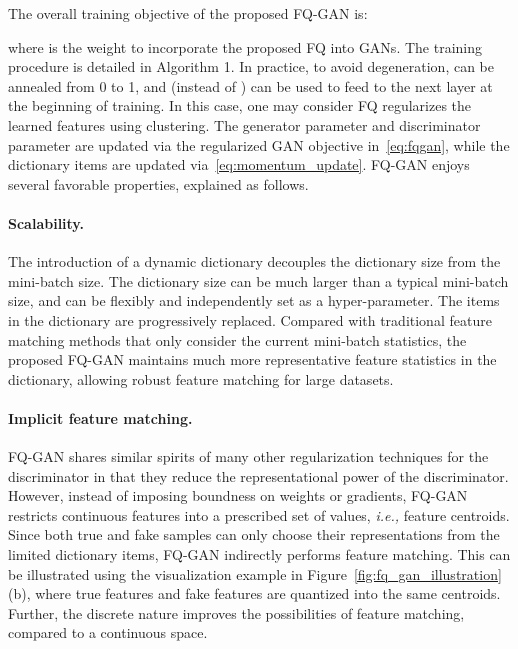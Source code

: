 \documentclass{article}
\newcommand{\ie}[0]{\emph{i.e., }}
\begin{document}
The overall training objective of the proposed FQ-GAN is:

where  is the weight to incorporate the proposed FQ into GANs. The training procedure is detailed in Algorithm 1. In practice, to avoid degeneration,  can be annealed from 0 to 1, and  (instead of ) can be used to feed to the next layer at the beginning of training. In this case, one may consider FQ regularizes the learned features using clustering. The generator parameter  and discriminator parameter  are updated via the regularized GAN objective in~\eqref{eq:fqgan},
while the dictionary items  are updated via~\eqref{eq:momentum_update}.   
FQ-GAN enjoys several favorable properties, explained as follows. 


\paragraph{Scalability.}
The introduction of a dynamic dictionary decouples the dictionary size from the mini-batch size. The dictionary size can be much larger than a typical mini-batch size, and can be flexibly and independently set as a hyper-parameter. The items in the dictionary are progressively replaced. Compared with traditional feature matching methods that only consider the current mini-batch statistics, the proposed FQ-GAN maintains much more representative feature statistics in the dictionary, allowing robust feature matching for large datasets.

\paragraph{Implicit feature matching.} FQ-GAN shares similar spirits of many other regularization techniques for the discriminator in that they reduce the representational power of the discriminator. However, instead of imposing boundness on weights or gradients, FQ-GAN restricts continuous features into a prescribed set of values, \ie feature centroids. Since both true and fake samples can only choose their representations from the limited dictionary items, FQ-GAN indirectly performs feature matching. This can be illustrated using the visualization example in Figure~\ref{fig:fq_gan_illustration} (b), where true features  and fake features  are quantized into the same centroids. Further, the discrete nature improves the possibilities of feature matching, compared to a continuous space.
\end{document}
